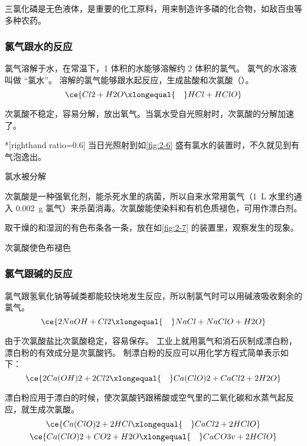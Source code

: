 三氯化磷是无色液体，是重要的化工原料，用来制造许多磷的化合物，如敌百虫等多种农药。

\subsubsection{氯气跟水的反应}
氯气溶解于水，在常温下，1 体积的水能够溶解约 2 体积的氯气。
氯气的水溶液叫做 “氯水”。
溶解的氯气能够跟水起反应，生成盐酸和次氯酸（）。
\[ \ce{Cl2 + H2O \xlongequal{\quad} HCl + HClO} \]

次氯酸不稳定，容易分解，放出氧气。当氯水受自光照射时，次氯酸的分解加速了。

\begin{Experiment}*[righthand ratio=0.6]
  当日光照射到如\cref{fig:2-6} 盛有氯水的装置时，不久就见到有气泡逸出。
  \tcblower
  \begin{figurehere}
    \caption{氯水被分解}\label{fig:2-6}
  \end{figurehere}
\end{Experiment}
次氯酸是一种强氧化剂，能杀死水里的病菌，所以自来水常用氯气（\qty{1}{L} 水里约通入 \qty{0.002}{g} 氯气）来杀菌消毒。次氯酸能使染料和有机色质褪色，可用作漂白剂。

\begin{Experiment}
  取干燥的和湿润的有色布条各一条，放在如\cref{fig:2-7} 的装置里，观察发生的现象。
  \tcblower
  \begin{figurehere}
    \caption{次氯酸使色布褪色}\label{fig:2-7}
  \end{figurehere}
\end{Experiment}
\subsubsection{氯气跟碱的反应}
氯气跟氢氧化钠等碱类都能较快地发生反应，所以制氯气时可以用碱液吸收剩余的氯气。
\[ \ce{ 2NaOH + Cl2 \xlongequal{\quad} NaCl + NaClO + H2O } \]

由于次氯酸盐比次氯酸稳定，容易保存。
工业上就用氯气和消石灰制成漂白粉，漂白粉的有效成分是次氯酸钙。
制漂白粉的反应可以用化学方程式简单表示如下：
\[ \ce{ 2Ca(OH)2 + 2Cl2 \xlongequal{\quad} Ca(ClO)2 +CaCl2 +2H2O } \]

漂白粉应用于漂白的时候，使次氯酸钙跟稀酸或空气里的二氧化碳和水蒸气起反应，就生成次氯酸。
\begin{gather*}
  \ce{ Ca(ClO)2 + 2HCl \xlongequal{\quad} CaCl2 +2HClO } \\
  \ce{ Ca(ClO)2 + CO2 +H2O \xlongequal{\quad} CaCO3 v + 2 HClO }
\end{gather*}
